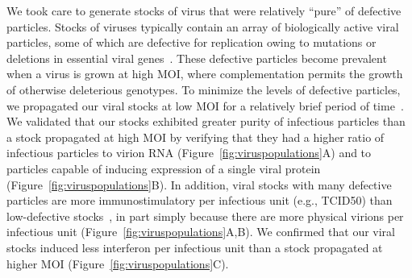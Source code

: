 \documentclass[9pt,lineno]{elife}
\begin{document}
We took care to generate stocks of virus that were relatively ``pure'' of defective particles.
Stocks of viruses typically contain an array of biologically active viral particles, some of which are defective for replication owing to mutations or deletions in essential viral genes~\citep{von1954incomplete,huang1970defective,Brooke:2014ch,Fonville:2015cg,Lauring:2010if,Dimmock:2014dk,saira2013sequence}.
These defective particles become prevalent when a virus is grown at high MOI, where complementation permits the growth of otherwise deleterious genotypes.
To minimize the levels of defective particles, we propagated our viral stocks at low MOI for a relatively brief period of time~\citep{Xue:2016bw}.
We validated that our stocks exhibited greater purity of infectious particles than a stock propagated at high MOI by verifying that they had a higher ratio of infectious particles to virion RNA (Figure~\ref{fig:viruspopulations}A) and to particles capable of inducing expression of a single viral protein (Figure~\ref{fig:viruspopulations}B).
In addition, viral stocks with many defective particles are more immunostimulatory per infectious unit (e.g., TCID50) than low-defective stocks~\citep{Tapia:2013kf,Lopez:2014en}, in part simply because there are more physical virions per infectious unit (Figure~\ref{fig:viruspopulations}A,B).
We confirmed that our viral stocks induced less interferon per infectious unit than a stock propagated at higher MOI (Figure~\ref{fig:viruspopulations}C).
\end{document}
